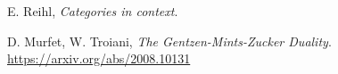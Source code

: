 \documentclass[12pt]{article}
\theoremstyle{plain}
\theoremstyle{definition}
\begin{document}
	\begin{thebibliography}{9}
		 E. Reihl, \emph{Categories in context}.
		
		 D. Murfet, W. Troiani, \emph{The Gentzen-Mints-Zucker Duality}. \url{https://arxiv.org/abs/2008.10131}
		\end{thebibliography}
	
	
	
	
	
	
	
	
	
	
	
	
	
	
	
	
	
	
	
	
	
	
	
	
\end{document}
